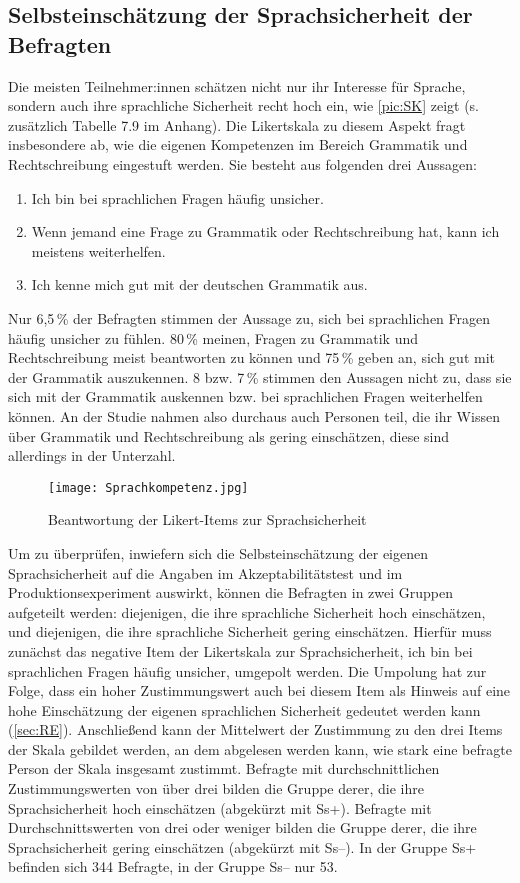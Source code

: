 \subsection{Selbsteinschätzung der Sprachsicherheit der Befragten}
\label{sec:Sprachsicherheit}
Die meisten Teilnehmer:innen schätzen nicht nur ihr Interesse für Sprache, sondern auch ihre sprachliche Sicherheit recht hoch ein, wie \autoref{pic:SK} zeigt (s. zusätzlich Tabelle 7.9 im Anhang). 
Die Likertskala zu diesem Aspekt fragt insbesondere ab, wie die eigenen Kompetenzen im Bereich Grammatik und Rechtschreibung eingestuft werden. 
Sie besteht aus folgenden drei Aussagen: 
\begin{enumerate}
\item Ich bin bei sprachlichen Fragen häufig unsicher.
\item Wenn jemand eine Frage zu Grammatik oder Rechtschreibung hat, kann ich meistens weiterhelfen.
\item  Ich kenne mich gut mit der deutschen Grammatik aus.
\end{enumerate}

Nur 6,5\,\% der Befragten stimmen der Aussage zu, sich bei sprachlichen Fragen häufig unsicher zu fühlen. 
80\,\% meinen, Fragen zu Grammatik und Rechtschreibung meist beantworten zu können und 75\,\% geben an, sich gut mit der Grammatik auszukennen. 
8 bzw. 7\,\% stimmen den Aussagen nicht zu, dass sie sich mit der Grammatik auskennen bzw. bei sprachlichen Fragen weiterhelfen können. 
An der Studie nahmen also durchaus auch Personen teil, die ihr Wissen über Grammatik und Rechtschreibung als gering einschätzen, diese sind allerdings in der Unterzahl.
\begin{figure}[htb]
\centering
\texttt{[image: Sprachkompetenz.jpg]}
\caption{Beantwortung der Likert-Items zur Sprachsicherheit}
\label{pic:SK}
\end{figure}

Um zu überprüfen, inwiefern sich die Selbsteinschätzung der eigenen Sprachsicherheit auf die Angaben im Akzeptabilitätstest und im Produktionsexperiment auswirkt, können die Befragten in zwei Gruppen aufgeteilt werden: 
diejenigen, die ihre sprachliche Sicherheit hoch einschätzen, und diejenigen, die ihre sprachliche Sicherheit gering einschätzen. 
Hierfür muss zunächst das negative Item der Likertskala zur Sprachsicherheit, \glqq ich bin bei sprachlichen Fragen häufig unsicher\grqq, umgepolt werden. 
Die Umpolung hat zur Folge, dass ein hoher Zustimmungswert auch bei diesem Item als Hinweis auf eine hohe Einschätzung der eigenen sprachlichen Sicherheit gedeutet werden kann (\autoref{sec:RE}). 
Anschließend kann der Mittelwert der Zustimmung zu den drei Items der Skala gebildet werden, an dem abgelesen werden kann, wie stark eine befragte Person der Skala insgesamt zustimmt. 
Befragte mit durchschnittlichen Zustimmungswerten von über drei bilden die Gruppe derer, die ihre Sprachsicherheit hoch einschätzen (abgekürzt mit Ss+). 
Befragte mit Durchschnittswerten von drei oder weniger bilden die Gruppe derer, die ihre Sprachsicherheit gering einschätzen (abgekürzt mit Ss--). 
In der Gruppe Ss+ befinden sich 344 Befragte, in der Gruppe Ss-- nur 53. 

